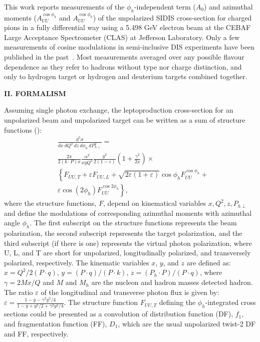 \documentclass[aps,prl,twocolumn,showpacs,superscriptaddress,groupedaddress]{revtex4-1}  %
\newcommand{\zh}{z}
\newcommand{\xbj}{x}
\begin{document}
This work reports measurements of the $\phi_h$-independent term ($A_0$) and azimuthal moments ($A^{\cos \phi_h}_{UU}$ and $A^{\cos \phi_h}_{UU}$) of the unpolarized SIDIS cross-section for charged pions in a fully differential way using a 5.498 GeV electron beam at the CEBAF Large Acceptance Spectrometer (CLAS) \cite{Mecking:2003zu} at Jefferson Laboratory.
Only a few measurements of cosine modulations in semi-inclusive DIS experiments have been published in the past~\cite{Aubert:1983cz,Arneodo:1986cf,Adams:1993hs,Breitweg:2000qh}.
Most measurements averaged over any possible flavour dependence as they refer to hadrons without type nor charge distinction, and only to hydrogen target or hydrogen and deuterium targets combined together.


\begin{center}
\textbf{II. FORMALISM} \par
\end{center}
Assuming single photon exchange, the leptoproduction cross-section for an unpolarized beam and unpolarized target can be written as a sum of structure functions (\cite{Bacchetta:2006tn}):
\begin{equation}
\label{eq:crosssection3}
\begin{split}
& \frac{d^{5} \sigma}{dx\ dQ^2\ dz\ d \phi_{h}\ dP_{h \perp}^{2}} =
\\
& \frac{2\pi}{2(k\cdot P)x} \frac{\alpha^{2}}{xyQ^{2}} \frac{y^{2}}{2 \left( 1 - \varepsilon \right)} \left( 1 + \frac{\gamma^{2}}{2x} \right) \times
\\
& \left\{ F_{UU,T} + \varepsilon F_{UU,L} + \sqrt{2 \varepsilon \left( 1 + \varepsilon \right)} \cos \phi_{h} F^{\cos \phi_{h}}_{UU} + \right.
\\
& \left. \varepsilon \cos \left( 2 \phi_{h} \right) F_{UU}^{\cos2\phi_{h}} \right\},
\end{split}
\end{equation}
where the structure functions, $F$, depend on kinematical variables $x,Q^2,z,P_{h\perp}$ and define the modulations of corresponding azimuthal moments with azimuthal angle $\phi_{h}$.
The first subscript on the structure functions represents the beam polarization, the second subscript repsresents the target polarization, and the third subscript (if there is one) represents the virtual photon polarization, where U, L, and T are short for unpolarized, longitudinally polarized, and transversely polarized, respectively.
The kinematic variables $\xbj$, $y$, and $z$  are defined as: 
$\xbj = Q^2/{2(P\cdot q)}$, $y={(P \cdot q)/(P \cdot k)}$, $\zh=(P_h \cdot P)/(P \cdot q)$, 
where $\gamma=2M\xbj /Q$ and $M$ and $M_h$ are the nucleon and hadron masses detected hadron.
The ratio $\varepsilon$ of the longitudinal and transverse photon flux is given by: $\varepsilon=\frac{1-y-\gamma^2y^2/4}{1-y+y^2/2+\gamma^2y^2/4}$.
The structure function  $F_{UU,T}$  defining the $\phi_h$-integrated cross sections could be presented as a convolution of  distribution function (DF), $f_1$,   and fragmentation function (FF), $D_1$, which  are the usual unpolarized twist-2 DF and FF, respectively. 
\end{document}
